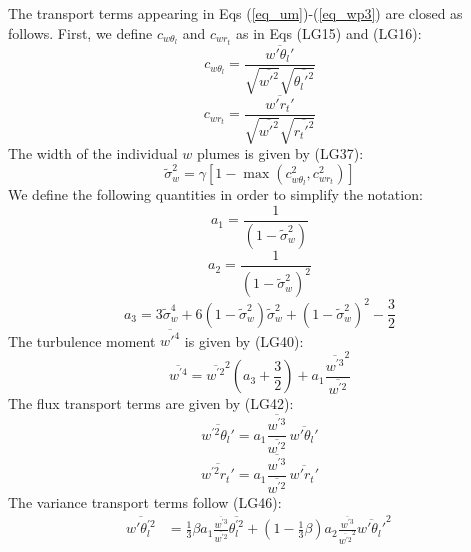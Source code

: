 \documentclass[11pt,fleqn]{article}
\begin{document}
The transport terms appearing in Eqs (\ref{eq_um})-(\ref{eq_wp3}) are
closed as follows. First, we define $c_{w\theta_l}$ and $c_{wr_t}$
as in Eqs (LG15) and (LG16):
%
\begin{equation}
\label{eq_cwthl}
c_{w\theta_l} 
= \frac{ \overline{w'\theta_l'} }
       { \sqrt{\overline{w'^2}}\sqrt{\overline{\theta_l'^2}} }
\end{equation}
%
\begin{equation}
\label{eq_cwrt}
c_{wr_t} 
= \frac{ \overline{w'r_t'} }
       { \sqrt{\overline{w'^2}}\sqrt{\overline{r_t'^2}} }
\end{equation}
%
The width of the individual $w$ plumes is given by (LG37):
%
\begin{equation}
\label{eq_sc}
\tilde{\sigma}^2_w 
= \gamma \left[ 1 - \max\left( c^2_{w\theta_l}, c^2_{wr_t} \right) \right]
\end{equation}
%
We define the following quantities in order to simplify the notation:
% 
\begin{equation}
\label{eq_a1}
a_1 = \frac{1}{ (1-\tilde{\sigma}_w^2) }
\end{equation}
%
\begin{equation}
\label{eq_a2}
a_2 = \frac{1}{ (1-\tilde{\sigma}_w^2)^2 }
\end{equation}
%
\begin{equation}
\label{eq_a3}
a_3 = 3 \tilde{\sigma}_w^4 
      + 6 ( 1 - \tilde{\sigma}_w^2 ) \tilde{\sigma}_w^2
      + ( 1 - \tilde{\sigma}_w^2 )^2 
      -\frac{3}{2}
\end{equation}
%
The turbulence moment $\overline{w'^4}$ is given by (LG40):
%
\begin{equation}
\label{eq_wp4}
\overline{w^{'4}}
= \overline{w^{'2}}^2
  \left( a_3 + \frac{3}{2} \right)
+ a_1 \frac{ \overline{w^{'3}}^2 }{ \overline{w^{'2}} }
\end{equation}
%
The flux transport terms are given by (LG42):
%
\begin{equation}
\label{eq_wp2thlp}
\overline{w^{'2}\theta_l'}
= a_1 \frac{\overline{w^{'3}}}{\overline{w^{'2}}} \,
  \overline{w'\theta_l'}
\end{equation}
%
\begin{equation}
\label{eq_wp2rtp}
\overline{w^{'2}r_t'}
= a_1 \frac{\overline{w^{'3}}}{\overline{w^{'2}}} \,
  \overline{w'r_t'}
\end{equation}
%
The variance transport terms follow (LG46):
%
\begin{equation}
\label{eq_wpthlp2}
\begin{split}
\overline{w'\theta_l^{'2}}
& = 
    \frac{1}{3} \beta
    a_1 \frac{\overline{w^{'3}}}{\overline{w^{'2}}} \overline{\theta_l^{'2}}
  + \left( 1 - \frac{1}{3}\beta \right)
    a_2 \frac{\overline{w^{'3}}}{\overline{w^{'2}}^2} \overline{w'\theta_l'}^2 \,
\end{split}
\end{equation}
\end{document}
